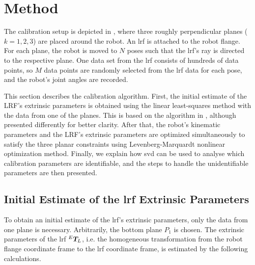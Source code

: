 \section{Method}
\label{sec:method}

The calibration setup is depicted in , where three roughly perpendicular planes ($k=1,2,3$) are placed around the robot. An \ac{lrf} is attached to the robot flange. For each plane, the robot is moved to $N$ poses such that the \ac{lrf}'s ray is directed to the respective plane. One data set from the \ac{lrf} consists of hundreds of data points, so $M$ data points are randomly selected from the \ac{lrf} data for each pose, and the robot's joint angles are recorded. 

This section describes the calibration algorithm. First, the initial estimate of the LRF's extrinsic parameters is obtained using the linear least-squares method with the data from one of the planes. This is based on the algorithm in \cite{Zhang2004}, although presented differently for better clarity. After that, the robot's kinematic parameters and the LRF's extrinsic parameters are optimized simultaneously to satisfy the three planar constraints using Levenberg-Marquardt nonlinear optimization method. Finally, we explain how \ac{svd} can be used to analyse which calibration parameters are identifiable, and the steps to handle the unidentifiable parameters are then presented. 
\subsection{Initial Estimate of the \ac{lrf} Extrinsic Parameters}
\label{sec:first_step}
To obtain an initial estimate of the \ac{lrf}'s extrinsic parameters, only the data from one plane is necessary. Arbitrarily, the bottom plane $P_1$ is chosen. The extrinsic parameters of the \ac{lrf} ${^E}\vb*{T}_L$, i.e. the homogeneous transformation from the robot flange coordinate frame to the \ac{lrf} coordinate frame, is estimated by the following calculations.

